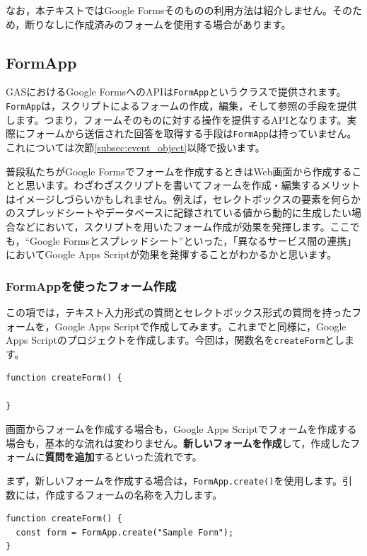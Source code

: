 \documentclass[uplatex,a4j]{jsarticle}
\begin{document}
なお，本テキストではGoogle Formsそのものの利用方法は紹介しません。そのため，断りなしに作成済みのフォームを使用する場合があります。

\subsection{FormApp}

GASにおけるGoogle FormsへのAPIは\verb|FormApp|というクラスで提供されます。\verb|FormApp|は，スクリプトによるフォームの作成，編集，そして参照の手段を提供します。つまり，フォームそのものに対する操作を提供するAPIとなります。実際にフォームから送信された回答を取得する手段は\verb|FormApp|は持っていません。これについては次節\ref{subsec:event_object}以降で扱います。

普段私たちがGoogle Formsでフォームを作成するときはWeb画面から作成することと思います。わざわざスクリプトを書いてフォームを作成・編集するメリットはイメージしづらいかもしれません。例えば，セレクトボックスの要素を何らかのスプレッドシートやデータベースに記録されている値から動的に生成したい場合などにおいて，スクリプトを用いたフォーム作成が効果を発揮します。ここでも，``Google Formsとスプレッドシート''といった，「異なるサービス間の連携」においてGoogle Apps Scriptが効果を発揮することがわかるかと思います。

\subsubsection{FormAppを使ったフォーム作成}

この項では，テキスト入力形式の質問とセレクトボックス形式の質問を持ったフォームを，Google Apps Scriptで作成してみます。これまでと同様に，Google Apps Scriptのプロジェクトを作成します。今回は，関数名を\verb|createForm|とします。

\begin{lstlisting}[basicstyle=\ttfamily\footnotesize,frame=single,caption=FormApp sample 1]
function createForm() {

}
\end{lstlisting}

画面からフォームを作成する場合も，Google Apps Scriptでフォームを作成する場合も，基本的な流れは変わりません。\textbf{新しいフォームを作成}して，作成したフォームに\textbf{質問を追加}するといった流れです。

まず，新しいフォームを作成する場合は，\verb|FormApp.create()|を使用します。引数には，作成するフォームの名称を入力します。

\begin{lstlisting}[basicstyle=\ttfamily\footnotesize,frame=single,caption=FormApp sample 2]
function createForm() {
  const form = FormApp.create("Sample Form");
}
\end{lstlisting}
\end{document}
